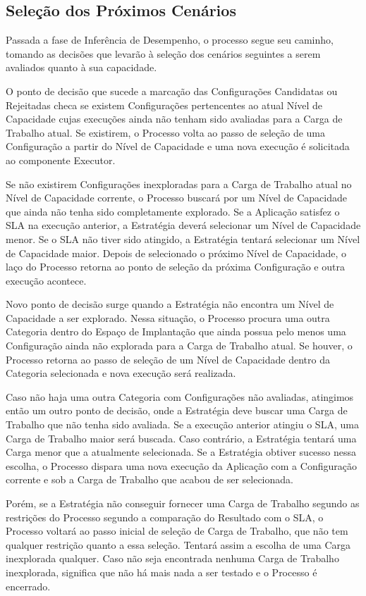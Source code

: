 \subsection{Seleção dos Próximos Cenários}
Passada a fase de Inferência de Desempenho, o processo segue seu caminho, tomando
as decisões que levarão à seleção dos cenários seguintes a serem avaliados quanto
à sua capacidade.

O ponto de decisão que sucede a marcação das Configurações Candidatas ou Rejeitadas
checa se existem Configurações pertencentes ao atual Nível de Capacidade cujas 
execuções ainda não tenham sido avaliadas para a Carga de Trabalho atual. Se 
existirem, o Processo volta ao passo de seleção de uma Configuração a partir do 
Nível de Capacidade e uma nova execução é solicitada ao componente Executor.

Se não existirem Configurações inexploradas para a Carga de Trabalho atual no
Nível de Capacidade corrente, o Processo buscará por um Nível de Capacidade que 
ainda não tenha sido completamente explorado. Se a Aplicação satisfez o SLA na 
execução anterior, a Estratégia deverá selecionar um Nível de Capacidade menor. 
Se o SLA não tiver sido atingido, a Estratégia tentará selecionar um  Nível de 
Capacidade maior. Depois de selecionado o próximo Nível de Capacidade, o laço do
Processo retorna ao ponto de seleção da próxima Configuração e outra execução 
acontece.
   
Novo ponto de decisão surge quando a Estratégia não encontra um Nível de 
Capacidade a ser explorado. Nessa situação, o Processo procura uma outra
Categoria dentro do Espaço de Implantação que ainda possua pelo menos uma
Configuração ainda não explorada para a Carga de Trabalho atual. Se houver,
o Processo retorna ao passo de seleção de um Nível de Capacidade dentro da
Categoria selecionada e nova execução será realizada.

Caso não haja uma outra Categoria com Configurações não avaliadas, atingimos
então um outro ponto de decisão, onde a Estratégia deve buscar uma Carga 
de Trabalho que não tenha sido avaliada. Se a execução anterior atingiu o SLA,
uma Carga de Trabalho maior será buscada. Caso contrário, a Estratégia tentará
uma Carga menor que a atualmente selecionada. Se a Estratégia obtiver sucesso
nessa escolha, o Processo dispara uma nova execução da Aplicação com a Configuração
corrente e sob a Carga de Trabalho que acabou de ser selecionada.

Porém, se a Estratégia não conseguir fornecer uma Carga de Trabalho segundo as 
restrições do Processo segundo a comparação do Resultado com o SLA, o Processo 
voltará ao passo inicial de seleção de Carga de Trabalho, que não tem qualquer 
restrição quanto a essa seleção. Tentará assim a escolha de uma Carga inexplorada
qualquer. Caso não seja encontrada nenhuma Carga de Trabalho inexplorada, significa
que não há mais nada a ser testado e o Processo é encerrado.

